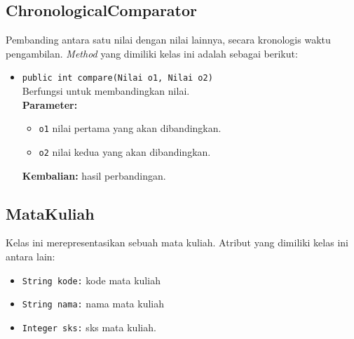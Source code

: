 \subsection{ChronologicalComparator}
Pembanding antara satu nilai dengan nilai lainnya, secara kronologis waktu pengambilan. \textit{Method} yang dimiliki kelas ini adalah sebagai berikut:

\begin{itemize}
	\item \texttt{public int compare(Nilai o1, Nilai o2) } \\
	Berfungsi untuk membandingkan nilai. \\
	\textbf{Parameter:}
	\begin{itemize}
		\item \texttt{o1} nilai pertama yang akan dibandingkan.
		\item \texttt{o2} nilai kedua yang akan dibandingkan.
	\end{itemize}
	\textbf{Kembalian:} hasil perbandingan.
\end{itemize}


\subsection{MataKuliah}
Kelas ini merepresentasikan sebuah mata kuliah. Atribut yang dimiliki kelas ini antara lain:
\begin{itemize}
	\item \texttt{String kode:} kode mata kuliah
	\item \texttt{String nama:} nama mata kuliah
	\item \texttt{Integer sks:} sks mata kuliah.
\end{itemize}

